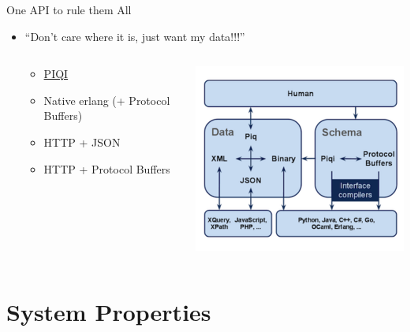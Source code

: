 \documentclass[aspectratio=169]{beamer}
\begin{document}
\begin{frame}{One API to rule them All}
    \begin{itemize}
        \item ``Don't care where it is, just want my data!!!''
        \pause
        \begin{columns}
            \begin{column}[c]{0.55\textwidth}
                    \begin{itemize}
                        \item \href{http://piqi.org}{PIQI}
                        \item Native erlang (+ Protocol Buffers)
                        \item HTTP + JSON
                        \item HTTP + Protocol Buffers
                    \end{itemize}
            \end{column}
            \begin{column}[c]{0.45\textwidth}
                \includegraphics[width=\textwidth]{images/piqi.png}
            \end{column}
        \end{columns}
    \end{itemize}
\end{frame}

\section{System Properties}
\end{document}
